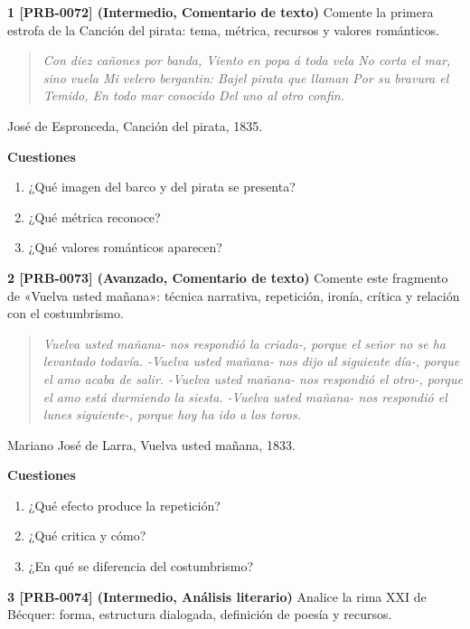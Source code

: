 \documentclass{book}
\begin{document}
\begin{tcolorbox}[title={Ejercicios}, studiumworked, breakable]

\noindent\textbf{1 [PRB-0072] (Intermedio, Comentario de texto)}
Comente la primera estrofa de la Canción del pirata: tema, métrica, recursos y valores románticos.


\begin{quote}
\itshape Con diez cañones por banda, Viento en popa á toda vela No corta el mar, sino vuela Mi velero bergantin: Bajel pirata que llaman Por su bravura el Temido, En todo mar conocido Del uno al otro confin.
\end{quote}
{\noindent\footnotesize José de Espronceda, Canción del pirata, 1835.\par}

\noindent\textbf{Cuestiones}
\begin{enumerate}
\item ¿Qué imagen del barco y del pirata se presenta?
\item ¿Qué métrica reconoce?
\item ¿Qué valores románticos aparecen?
\end{enumerate}

\noindent\textbf{2 [PRB-0073] (Avanzado, Comentario de texto)}
Comente este fragmento de «Vuelva usted mañana»: técnica narrativa, repetición, ironía, crítica y relación con el costumbrismo.


\begin{quote}
\itshape Vuelva usted mañana- nos respondió la criada-, porque el señor no se ha levantado todavía. -Vuelva usted mañana- nos dijo al siguiente día-, porque el amo acaba de salir. -Vuelva usted mañana- nos respondió el otro-, porque el amo está durmiendo la siesta. -Vuelva usted mañana- nos respondió el lunes siguiente-, porque hoy ha ido a los toros.
\end{quote}
{\noindent\footnotesize Mariano José de Larra, Vuelva usted mañana, 1833.\par}

\noindent\textbf{Cuestiones}
\begin{enumerate}
\item ¿Qué efecto produce la repetición?
\item ¿Qué critica y cómo?
\item ¿En qué se diferencia del costumbrismo?
\end{enumerate}

\noindent\textbf{3 [PRB-0074] (Intermedio, Análisis literario)}
Analice la rima XXI de Bécquer: forma, estructura dialogada, definición de poesía y recursos.



\end{tcolorbox}
\end{document}

